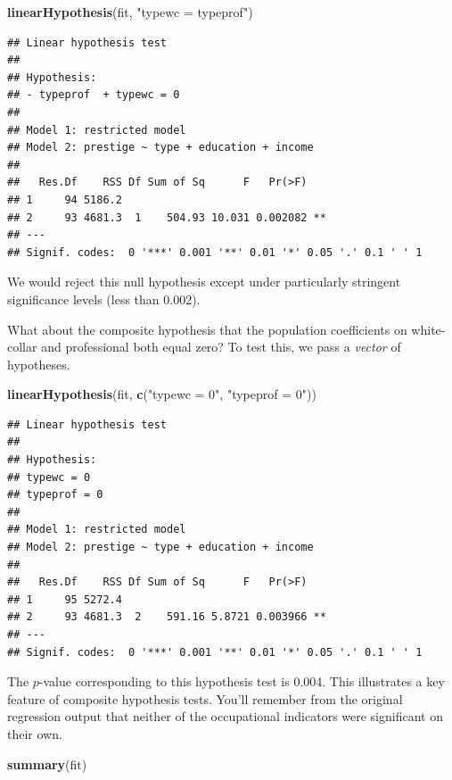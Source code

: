 \documentclass[12pt,oneside,openany]{book}
\newenvironment{Shaded}{\begin{snugshade}}{\end{snugshade}}
\newcommand{\KeywordTok}[1]{\textcolor[rgb]{0.13,0.29,0.53}{\textbf{#1}}}
\newcommand{\StringTok}[1]{\textcolor[rgb]{0.31,0.60,0.02}{#1}}
\newcommand{\NormalTok}[1]{#1}
\begin{document}
\begin{Shaded}
\begin{Highlighting}[]
\KeywordTok{linearHypothesis}\NormalTok{(fit, }\StringTok{"typewc = typeprof"}\NormalTok{)}
\end{Highlighting}
\end{Shaded}

\begin{verbatim}
## Linear hypothesis test
## 
## Hypothesis:
## - typeprof  + typewc = 0
## 
## Model 1: restricted model
## Model 2: prestige ~ type + education + income
## 
##   Res.Df    RSS Df Sum of Sq      F   Pr(>F)   
## 1     94 5186.2                                
## 2     93 4681.3  1    504.93 10.031 0.002082 **
## ---
## Signif. codes:  0 '***' 0.001 '**' 0.01 '*' 0.05 '.' 0.1 ' ' 1
\end{verbatim}

We would reject this null hypothesis except under particularly stringent
significance levels (less than 0.002).

What about the composite hypothesis that the population coefficients on
white-collar and professional both equal zero? To test this, we pass a
\emph{vector} of hypotheses.

\begin{Shaded}
\begin{Highlighting}[]
\KeywordTok{linearHypothesis}\NormalTok{(fit, }\KeywordTok{c}\NormalTok{(}\StringTok{"typewc = 0"}\NormalTok{, }\StringTok{"typeprof = 0"}\NormalTok{))}
\end{Highlighting}
\end{Shaded}

\begin{verbatim}
## Linear hypothesis test
## 
## Hypothesis:
## typewc = 0
## typeprof = 0
## 
## Model 1: restricted model
## Model 2: prestige ~ type + education + income
## 
##   Res.Df    RSS Df Sum of Sq      F   Pr(>F)   
## 1     95 5272.4                                
## 2     93 4681.3  2    591.16 5.8721 0.003966 **
## ---
## Signif. codes:  0 '***' 0.001 '**' 0.01 '*' 0.05 '.' 0.1 ' ' 1
\end{verbatim}

The \(p\)-value corresponding to this hypothesis test is 0.004. This
illustrates a key feature of composite hypothesis tests. You'll remember
from the original regression output that neither of the occupational
indicators were significant on their own.

\begin{Shaded}
\begin{Highlighting}[]
\KeywordTok{summary}\NormalTok{(fit)}
\end{Highlighting}
\end{Shaded}
\end{document}
